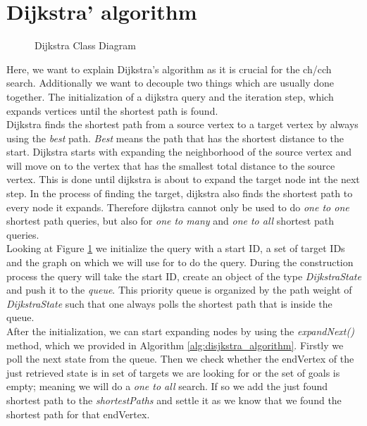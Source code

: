 \section{Dijkstra' algorithm} \label{sec:dijkstra}

\begin{figure}
    \centering
    
    \caption{Dijkstra Class Diagram}
    \label{fig:dijkstra_class}
\end{figure}

Here, we want to explain Dijkstra's algorithm as it is crucial for the ch/cch search.
Additionally we want to decouple two things which are usually done together.
The initialization of a dijkstra query and the iteration step, which expands vertices until the shortest path is found.
\\ 
Dijkstra finds the shortest path from a source vertex to a target vertex by always using the \textit{best} path. 
\textit{Best} means the path that has the shortest distance to the start.
Dijkstra starts with expanding the neighborhood of the source vertex and will move on to the vertex that has the smallest total distance to the source vertex.
This is done until dijkstra is about to expand the target node int the next step.
In the process of finding the target, dijkstra also finds the shortest path to every node it expands.
Therefore dijkstra cannot only be used to do \textit{one to one} shortest path queries, but also for \textit{one to many} and \textit{one to all} shortest path queries.
\\
Looking at Figure \ref{fig:dijkstra_class} we initialize the query with a start ID, a set of target IDs and the graph on which we will use for to do the query.
During the construction process the query will take the start ID, create an object of the type \textit{DijkstraState} and push it to the \textit{queue}.
This priority queue is organized by the path weight of \textit{DijkstraState} such that one always polls the shortest path that is inside the queue.
\\
After the initialization, we can start expanding nodes by using the \textit{expandNext()} method, which we provided in Algorithm \ref{alg:disjkstra_algorithm}.
Firstly we poll the next state from the queue.
Then we check whether the endVertex of the just retrieved state is in set of targets we are looking for or the set of goals is empty; meaning we will do a \textit{one to all} search.
If so we add the just found shortest path to the \textit{shortestPaths} and settle it as we know that we found the shortest path for that endVertex.

